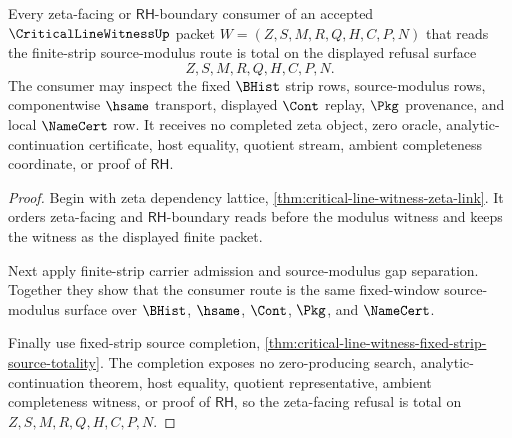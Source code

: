 \begin{theorem}
\label{thm:critical-line-witness-zeta-consumer-refusal-totality}
Every zeta-facing or $\mathsf{RH}$-boundary consumer of an accepted $\CriticalLineWitnessUp$ packet $W=(Z,S,M,R,Q,H,C,P,N)$ that reads the finite-strip source-modulus route is total on the displayed refusal surface
$$
Z,S,M,R,Q,H,C,P,N.
$$
The consumer may inspect the fixed $\BHist$ strip rows, source-modulus rows, componentwise $\hsame$ transport, displayed $\Cont$ replay, $\Pkg$ provenance, and local $\NameCert$ row. It receives no completed zeta object, zero oracle, analytic-continuation certificate, host equality, quotient stream, ambient completeness coordinate, or proof of $\mathsf{RH}$.
\end{theorem}
\begin{proof}
Begin with zeta dependency lattice, \autoref{thm:critical-line-witness-zeta-link}. It orders zeta-facing and $\mathsf{RH}$-boundary reads before the modulus witness and keeps the witness as the displayed finite packet.

Next apply finite-strip carrier admission and source-modulus gap separation. Together they show that the consumer route is the same fixed-window source-modulus surface over $\BHist$, $\hsame$, $\Cont$, $\Pkg$, and $\NameCert$.

Finally use fixed-strip source completion, \autoref{thm:critical-line-witness-fixed-strip-source-totality}. The completion exposes no zero-producing search, analytic-continuation theorem, host equality, quotient representative, ambient completeness witness, or proof of $\mathsf{RH}$, so the zeta-facing refusal is total on $Z,S,M,R,Q,H,C,P,N$.
\end{proof}

